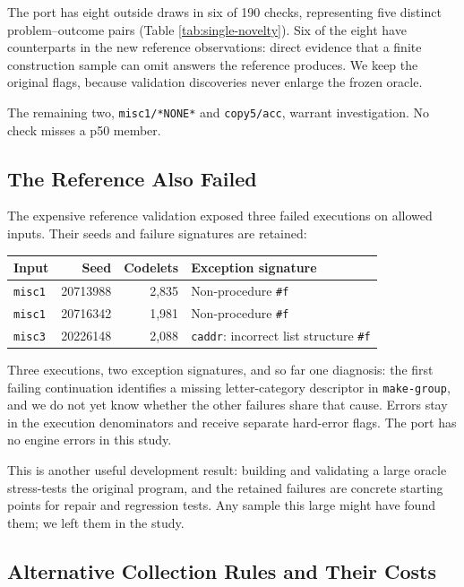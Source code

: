 \documentclass[10pt,letterpaper]{article}
\begin{document}
The port has eight outside draws in six of 190 checks, representing five distinct
problem--outcome pairs (Table \ref{tab:single-novelty}). Six of the eight have
counterparts in the new reference observations: direct evidence that a finite construction
sample can omit answers the reference produces. We keep the original flags, because
validation discoveries never enlarge the frozen oracle.

The remaining two, \texttt{misc1/*NONE*} and \texttt{copy5/acc}, warrant investigation. No
check misses a p50 member.



\subsection{The Reference Also Failed}\label{sec:reference-failures}

The expensive reference validation exposed three failed executions on allowed inputs.
Their seeds and failure signatures are retained:

{\def\LTcaptype{none} %
\begin{longtable}[]{@{}lrrl@{}}
\toprule\noalign{}
Input & Seed & Codelets & Exception signature \\
\midrule\noalign{}
\endhead
\bottomrule\noalign{}
\endlastfoot
\texttt{misc1} & 20713988 & 2,835 & Non-procedure \texttt{\#f} \\
\texttt{misc1} & 20716342 & 1,981 & Non-procedure \texttt{\#f} \\
\texttt{misc3} & 20226148 & 2,088 & \texttt{caddr}: incorrect list structure
\texttt{\#f} \\
\end{longtable}
}

Three executions, two exception signatures, and so far one diagnosis: the first failing
continuation identifies a missing letter-category descriptor in \texttt{make-group}, and
we do not yet know whether the other failures share that cause. Errors stay in the
execution denominators and receive separate hard-error flags. The port has no engine
errors in this study.

This is another useful development result: building and validating a large oracle
stress-tests the original program, and the retained failures are concrete starting points
for repair and regression tests. Any sample this large might have found them; we left them
in the study.

\subsection{Alternative Collection Rules and Their Costs}\label{sec:single-cost}
\end{document}
